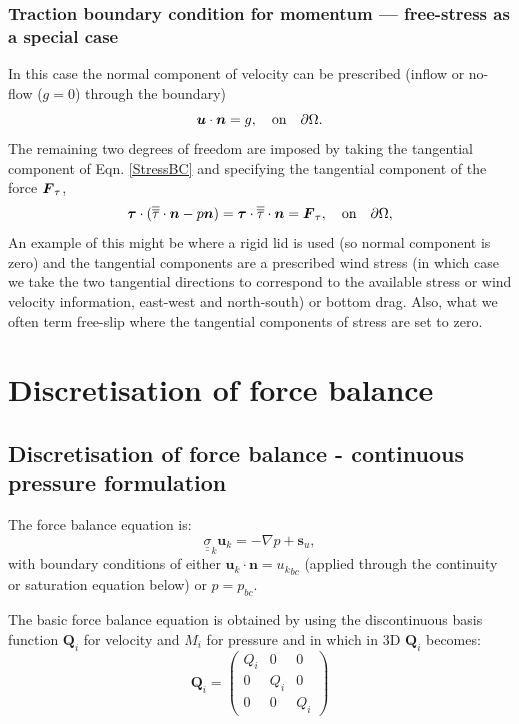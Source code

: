 \subsubsection{Traction boundary condition for momentum --- free-stress as a special case}\label{sect:bc_scalar_traction}
In this case the normal component of velocity can be prescribed (\eg inflow or no-flow ($g=0$) through the boundary)
\begin{equation}
{\mbox{\boldmath$u$}}\cdot{\mbox{\boldmath$n$}} = g,\quad \textrm{on}\quad \partial\Omega.
\end{equation}
The remaining two degrees of freedom are imposed by taking the tangential component of Eqn. \ref{StressBC} and specifying the tangential component of the force ${\mbox{\boldmath$F$}}_{\tau}$, \ie
\begin{equation}
{\mbox{\boldmath$\tau$}}\cdot(\overline{\overline{\tau}}\cdot{\mbox{\boldmath$n$}} - p{\mbox{\boldmath$n$}}) = {\mbox{\boldmath$\tau$}}\cdot\overline{\overline{\tau}}\cdot{\mbox{\boldmath$n$}} = {\mbox{\boldmath$F$}}_{\tau},\quad \textrm{on}\quad \partial\Omega,
\end{equation}
An example of this might be where a rigid lid is used (so normal component is zero) and the tangential components are a prescribed wind stress (in which case we take the two tangential directions to correspond to the available stress or wind velocity information, \ie east-west and north-south) or bottom drag. Also, what we often term free-slip where the tangential components of stress are set to zero.


\section{Discretisation of force balance} 


\subsection{Discretisation of force balance - continuous pressure formulation} 

The force balance equation is:
\begin{equation}
{\underline {\underline \sigma}}_k {\mathbf u}_k = - \nabla p + {\mathbf s}_u, 
\label{force-bal}
\end{equation}
with boundary conditions of either
${{\mathbf u}_k}\cdot {\mathbf n} = {{ u}_k}_{bc}$ (applied through the continuity  
or saturation 
equation below) or $p = p_{bc}$. 

The basic force balance equation is obtained by 
using the discontinuous basis function ${\mathbf Q}_i$ for velocity and 
$M_i$ for pressure and in which in 3D ${\mathbf Q}_i$ becomes:
\begin{equation}
{\mathbf Q}_i = 
  \begin{pmatrix}
    Q_i   & 0 & 0 \\
    0   & Q_i & 0 \\
    0 & 0 & Q_i
  \end{pmatrix}
\label{m_sigma_matrix}
\end{equation}

